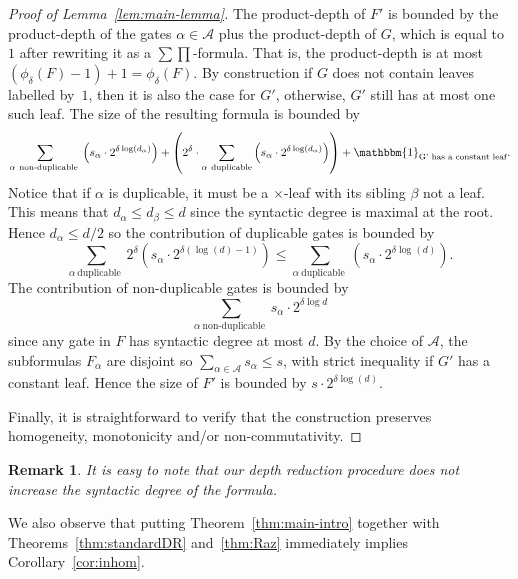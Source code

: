 \documentclass[10pt,a4paper]{article}
\newtheorem{remark}[theorem]{Remark}
\newcommand{\comment}[2]{\marginpar{\tiny{\textbf{#1: }\textit{#2}}}}
\newcommand{\nl}[1]{\comment{NL}{#1}}
\begin{document}
\begin{proof}[Proof of Lemma~\ref{lem:main-lemma}]
	
	The product-depth of $F'$ is bounded by the product-depth of the gates $\alpha \in \mathcal{A}$ plus the product-depth of $G$, which is equal to $1$ after rewriting it as a $\sum\prod$-formula. That is, the product-depth is at most  \((\phi_{\delta}(F)-1)+1 = \phi_{\delta}(F)\). By construction if \(G\) does not contain  leaves labelled by~$1$, then it is also the case for \(G'\), otherwise, \(G'\) still has at most one such leaf.
	The size of the resulting formula is bounded by
	\[ 	\sum_{\alpha\ \text{non-duplicable }} \left(s_\alpha \cdot 2^{\delta \log(d_\alpha)} \right)  
	+
	\left( 2^{\delta} \cdot \sum_{\alpha\ \text{duplicable}} \left(s_\alpha \cdot 2^{\delta \log(d_\alpha)} \right) \right) 
	+ \mathbbm{1}_{\text{G' has a constant leaf}} . \]
	Notice that if $\alpha$ is duplicable, it must be a \(\times\)-leaf with its sibling $\beta$ not a leaf. This
	means that $d_\alpha \leq d_\beta \leq d$ since the syntactic degree is maximal at the root. Hence $d_\alpha \leq d/2$
	so the contribution of duplicable gates is bounded by
	$$\sum_{\alpha\ \text{duplicable }} 2^\delta \left(s_\alpha \cdot 2^{\delta \left(\log(d)-1\right)} \right)
	\leq \sum_{\alpha\ \text{duplicable }} \left(s_\alpha \cdot 2^{\delta \log(d)} \right).$$
	The
	contribution of non-duplicable gates is bounded by
	$$\sum_{\alpha\ \text{non-duplicable }} s_\alpha \cdot 2^{\delta \log d}$$
	since any gate in $F$ has syntactic degree at most $d$.
	By the choice of $\mathcal{A}$, the subformulas $F_\alpha$ are disjoint
	so $\sum_{\alpha \in \mathcal{A}} s_\alpha \leq s$, with strict inequality if $G'$ has a constant leaf.
	Hence
	the size of $F'$ is bounded by $s\cdot 2^{\delta \log(d)}$.
	
	Finally, it is straightforward to verify that the construction preserves homogeneity, monotonicity and/or non-commutativity.
\end{proof}

\begin{remark}
	\label{rmk:degree-not-increase}
	It is easy to note that our depth reduction procedure does not increase the syntactic degree of the formula. 
\end{remark} %

We also observe that putting Theorem~\ref{thm:main-intro} together with Theorems~\ref{thm:standardDR} and~\ref{thm:Raz} immediately implies Corollary~\ref{cor:inhom}.
\end{document}
